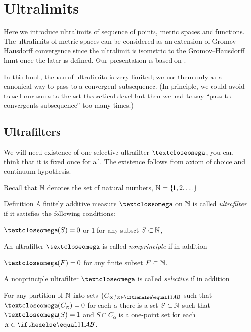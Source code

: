 \chapter{Ultralimits}

Here we introduce ultralimits of sequence of points, metric spaces and functions.
The ultralimits of metric spaces can be considered as an extension of Gromov--Hausdorff convergence since the ultralimit is isometric to the Gromov--Hausdorff limit once the later is defined.
Our presentation is based on \cite{kleiner-leeb}.

In this book, the use of ultralimits is very limited; 
we use them only as a canonical way to pass to a convergent subsequence.
(In principle, we could avoid to sell our souls 
to the set-theoretical devel but then we had to say ``pass to convergents subsequence'' too many times.)

\section{Ultrafilters}

We will need existence of one selective ultrafilter $\o$,
you can think that it is fixed once for all.
The existence follows from axiom of choice and continuum hypothesis.

Recall that $\mathbb{N}$ denotes the set of natural numbers, $\NN=\{1,2,\dots\}$

\begin{thm}{Definition}
A finitely additive measure $\o$ 
on  $\mathbb{N}$ 
is called \emph{ultrafilter} if it satisfies the following conditions: 
\begin{subthm}{}
$\o(S)=0$ or $1$ for any subset $S\subset \NN$,
\end{subthm}
An ultrafilter $\o$ is called 
\emph{nonprinciple} if in addition 
\begin{subthm}{}
$\o(F)=0$ for any finite subset $F\subset \NN$.
\end{subthm}
A nonprinciple ultrafilter $\o$ is called 
\emph{selective} if in addition 
\begin{subthm}{}
For any partition of $\mathbb{N}$ into sets $\{C_\alpha\}_{\alpha\in\IndexSet}$ such that $\o(C_\alpha)=0$ for each $\alpha$
there is a set $S\subset \NN$ such that $\o(S)=1$ and $S\cap C_\alpha$ is a one-point set for each $\alpha\in\IndexSet$.
\end{subthm}
\end{thm}

